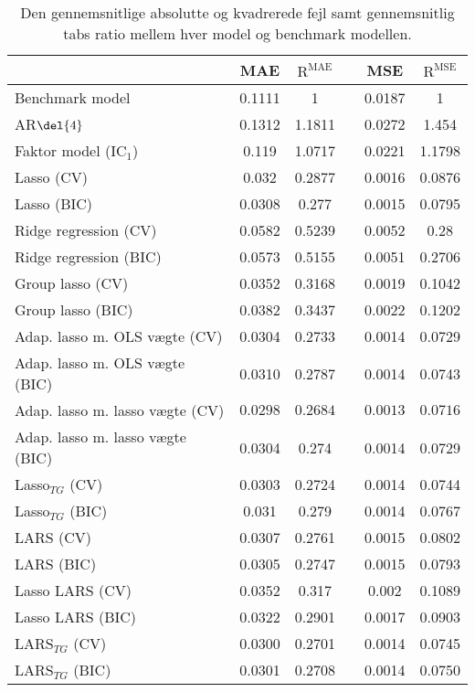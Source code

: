 \begin{table}[ht]
\center
\begin{tabular}{lccccc}
\toprule
 & MAE & \(\text{R}^{\text{MAE}}\) && MSE & \(\text{R}^{\text{MSE}}\) \\ \midrule
 Benchmark model & 0.1111 & 1 && 0.0187 & 1 \\
AR\(\del{4}\) & 0.1312 & 1.1811 && 0.0272 & 1.454 \\  
Faktor model (IC\(_1\)) & 0.119 & 1.0717 && 0.0221 & 1.1798 \\
Lasso (CV) & 0.032 & 0.2877 && 0.0016 & 0.0876 \\
Lasso (BIC) & 0.0308 & 0.277 && 0.0015 & 0.0795 \\
Ridge regression (CV) & 0.0582 & 0.5239 && 0.0052 & 0.28 \\
Ridge regression (BIC) & 0.0573 & 0.5155 && 0.0051 & 0.2706 \\
Group lasso (CV) & 0.0352 & 0.3168 && 0.0019 & 0.1042  \\
Group lasso (BIC) & 0.0382 & 0.3437 && 0.0022 & 0.1202 \\
Adap. lasso m. OLS vægte (CV) & 0.0304 & 0.2733 && 0.0014 & 0.0729 \\
Adap. lasso m. OLS vægte (BIC) & 0.0310 & 0.2787 && 0.0014 & 0.0743 \\
Adap. lasso m. lasso vægte (CV) & $\mathbf{0.0298}$ & $\mathbf{0.2684}$ && $\mathbf{0.0013}$ & $\mathbf{0.0716}$ \\
Adap. lasso m. lasso vægte (BIC) & 0.0304 & 0.274  && 0.0014 & 0.0729 \\
Lasso$_{TG}$ (CV)& 0.0303 & 0.2724 && 0.0014 & 0.0744 \\ 
Lasso$_{TG}$ (BIC) & 0.031 & 0.279 && 0.0014 & 0.0767 \\
LARS (CV) &  0.0307 & 0.2761 && 0.0015 & 0.0802 \\
LARS (BIC) & 0.0305 & 0.2747 && 0.0015 & 0.0793 \\
Lasso LARS (CV) &  0.0352 & 0.317 && 0.002 & 0.1089 \\
Lasso LARS (BIC) & 0.0322 & 0.2901 && 0.0017 & 0.0903 \\
LARS$_{TG}$ (CV) & 0.0300 & 0.2701 && 0.0014 & 0.0745 \\
LARS$_{TG}$ (BIC) & 0.0301 & 0.2708 && 0.0014 & 0.0750 \\ \bottomrule
\end{tabular}
\caption{Den gennemsnitlige absolutte og kvadrerede fejl samt gennemsnitlig tabs ratio mellem hver model og benchmark modellen.} \label{tab:mae_mse_vurdering}
\end{table}
